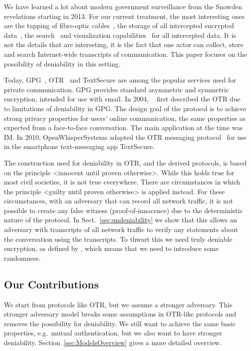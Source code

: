 We have learned a lot about modern government surveillance from the Snowden 
revelations starting in 2013.
For our current treatment, the most interesting ones are the tapping of 
fibre-optic cables~\cite{fibretap}, the storage of all intercepted encrypted 
data~\cite{cryptostore}, the search~\cite{xkeyscore} and visualization 
capabilities~\cite{boundlessinformant} for all intercepted data.
It is not the details that are interesting, it is the fact that one actor can 
collect, store and search Internet-wide transcripts of communication.
This paper focuses on the possibility of deniability in this setting.

Today, \ac{GPG}~\cite{gpg}, \ac{OTR}~\cite{otr} and Text\-Secure 
\cite{textsecure} are among the popular services used for private 
communication.
\ac{GPG} provides standard asymmetric and symmetric encryption, intended for 
use with email.
In 2004, \citeauthor{otr2004}~\cite{otr2004} first described the \ac{OTR} due 
to limitations of deniability in \ac{GPG}.
The design goal of the protocol is to achieve strong privacy properties for 
users' online communication, the same properties as expected from 
a face-to-face conversation.
The main application at the time was \ac{IM}.
In 2010, OpenWhisperSystems adapted the \ac{OTR} messaging 
protocol~\cite{frosch2014secure} for use in the smartphone text-messaging app 
TextSecure.

The construction used for deniability in \ac{OTR}, and the derived protocols, 
is based on the principle <innocent until proven otherwise>.
While this holds true for most civil societies, it is not true everywhere.
There are circumstances in which the principle <guilty until proven otherwise> 
is applied instead.
For these circumstances, with an adversary that can record all network traffic, 
it is not possible to create any false witness (proof-of-innocence) due to the 
deterministic nature of the protocol.
In Sect.~\ref{sec:undeniability} we show that this allows an adversary with 
transcripts of all network traffic to verify any statements about the 
conversation using the transcripts.
To thwart this we need truly deniable encryption, as defined by 
\citet{deniablecrypt}, which means that we need to introduce some randomness.

\subsection{Our Contributions}

We start from protocols like \ac{OTR}, but we assume a stronger adversary.
This stronger adversary model breaks some assumptions in \ac{OTR}-like 
protocols and removes the possibility for deniability.
We still want to achieve the same basic properties, e.g.~mutual authentication, 
but we also want to have stronger deniability.
Section~\ref{sec:ModelsOverview} gives a more detailed overview.

